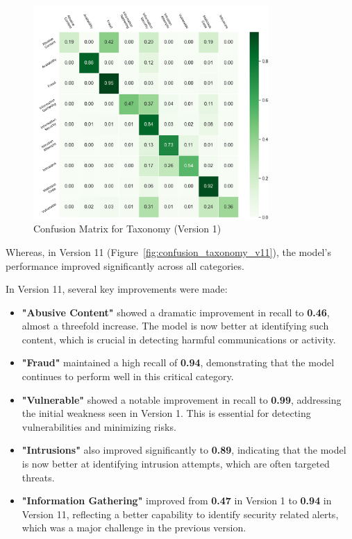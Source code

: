 \begin{figure}[h!]
    \centering
    \includegraphics[width=0.8\textwidth]{ch4/assets/v1_confusion_taxonomy.png}
    \caption{Confusion Matrix for Taxonomy (Version 1)}
    \label{fig:confusion_taxonomy_v1}
\end{figure}

Whereas, in Version 11 (Figure~\ref{fig:confusion_taxonomy_v11}), the model's performance improved significantly across all categories.

In Version 11, several key improvements were made:

\begin{itemize}
    \item \textbf{"Abusive Content"} showed a dramatic improvement in recall to \textbf{0.46}, almost a threefold increase. The model is now better at identifying such content, which is crucial in detecting harmful communications or activity.
    \item \textbf{"Fraud"} maintained a high recall of \textbf{0.94}, demonstrating that the model continues to perform well in this critical category.
    \item \textbf{"Vulnerable"} showed a notable improvement in recall to \textbf{0.99}, addressing the initial weakness seen in Version 1. This is essential for detecting vulnerabilities and minimizing risks.
    \item \textbf{"Intrusions"} also improved significantly to \textbf{0.89}, indicating that the model is now better at identifying intrusion attempts, which are often targeted threats.
    \item \textbf{"Information Gathering"} improved from \textbf{0.47} in Version 1 to \textbf{0.94} in Version 11, reflecting a better capability to identify security related alerts, which was a major challenge in the previous version.
\end{itemize}

